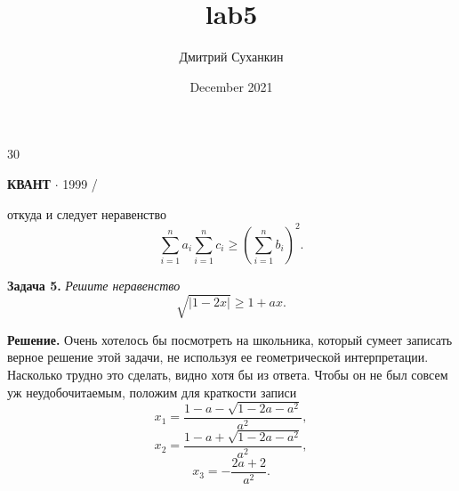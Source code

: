 \documentclass{article}
\title{lab5}
\author{Дмитрий Суханкин}
\date{December 2021}
\begin{document}
\begin{minipage}[b]{0.33333\textwidth}
\raggedright
{\large 30}
\end{minipage}%
\begin{minipage}[b]{0.33333\textwidth}
\centering
\textbf{КВАНТ} $\cdot$ \textsf{1999 \slash {}}
\end{minipage}%

\begin{multicols}{3}
откуда и следует неравенство \\
\[\sum_{i=1}^{n} a_i \sum_{i=1}^{n} c_i \geq (\sum_{i=1}^{n} b_i)^2.\] \par
\textbf{Задача 5.} \textsl{Решите неравенство}
\[\sqrt{|1 - 2x|} \geq 1 + ax.\] \par
\textbf{Решение.}  Очень хотелось бы посмотреть на школьника,
который сумеет записать верное решение этой задачи,
не используя ее геометрической интерпретации. Насколько
трудно это сделать, видно хотя бы из ответа. Чтобы он не
был совсем уж неудобочитаемым, положим для краткости записи\\
\[x_1 = \frac{1 - a - \sqrt{1 - 2a - a^2}}{a^2},\]
\[x_2 = \frac{1 - a + \sqrt{1 - 2a - a^2}}{a^2},\]
\[x_3 = -\frac{2a + 2}{a^2}.\]


\end{multicols}
\end{document}
